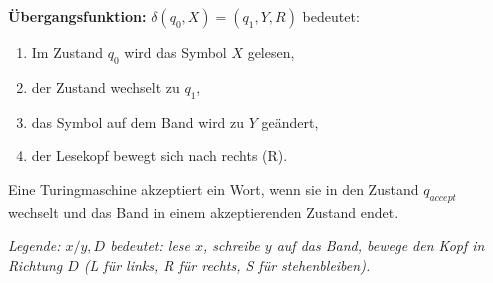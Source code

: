 \documentclass{article}
\begin{document}
\hfill
\begin{minipage}[t]{0.45\textwidth}
    \textbf{Übergangsfunktion:} $\delta(q_0, X) = (q_1, Y, R)$ bedeutet:
    \begin{enumerate}
        \item Im Zustand $q_0$ wird das Symbol $X$ gelesen,
        \item der Zustand wechselt zu $q_1$,
        \item das Symbol auf dem Band wird zu $Y$ geändert,
        \item der Lesekopf bewegt sich nach rechts (R).
    \end{enumerate}
    Eine Turingmaschine akzeptiert ein Wort, wenn sie in den Zustand $q_{accept}$ wechselt und das Band in einem akzeptierenden Zustand endet.
    \begin{center}
    \end{center}
    \textit{Legende: $x/y,D$ bedeutet: lese $x$, schreibe $y$ auf das Band, bewege den Kopf in Richtung $D$ (L für links, R für rechts, S für stehenbleiben).}
\end{minipage}
\end{document}
